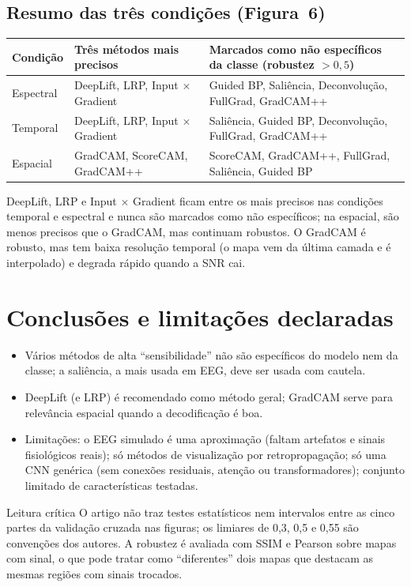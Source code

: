 \documentclass[11pt,a4paper]{article}
\begin{document}
\subsection{Resumo das três condições (Figura~6)}
\begin{center}\small
\begin{tabularx}{\linewidth}{lXX}
\toprule
\textbf{Condição} & \textbf{Três métodos mais precisos} & \textbf{Marcados como não específicos da classe (robustez $> 0{,}5$)} \\
\midrule
Espectral & DeepLift, LRP, Input $\times$ Gradient & Guided BP, Saliência, Deconvolução, FullGrad, GradCAM++ \\
Temporal  & DeepLift, LRP, Input $\times$ Gradient & Saliência, Guided BP, Deconvolução, FullGrad, GradCAM++ \\
Espacial  & GradCAM, ScoreCAM, GradCAM++ & ScoreCAM, GradCAM++, FullGrad, Saliência, Guided BP \\
\bottomrule
\end{tabularx}
\end{center}
DeepLift, LRP e Input $\times$ Gradient ficam entre os mais precisos nas condições temporal e espectral e nunca são marcados como não específicos; na espacial, são menos precisos que o GradCAM, mas continuam robustos. O GradCAM é robusto, mas tem baixa resolução temporal (o mapa vem da última camada e é interpolado) e degrada rápido quando a SNR cai.

\section{Conclusões e limitações declaradas}
\begin{itemize}
\item Vários métodos de alta “sensibilidade” não são específicos do modelo nem da classe; a saliência, a mais usada em EEG, deve ser usada com cautela.
\item DeepLift (e LRP) é recomendado como método geral; GradCAM serve para relevância espacial quando a decodificação é boa.
\item Limitações: o EEG simulado é uma aproximação (faltam artefatos e sinais fisiológicos reais); só métodos de visualização por retropropagação; só uma CNN genérica (sem conexões residuais, atenção ou transformadores); conjunto limitado de características testadas.
\end{itemize}
\begin{infobox}[warn]{Leitura crítica}
O artigo não traz testes estatísticos nem intervalos entre as cinco partes da validação cruzada nas figuras; os limiares de 0,3, 0,5 e 0,55 são convenções dos autores. A robustez é avaliada com SSIM e Pearson sobre mapas com sinal, o que pode tratar como “diferentes” dois mapas que destacam as mesmas regiões com sinais trocados.
\end{infobox}
\end{document}
